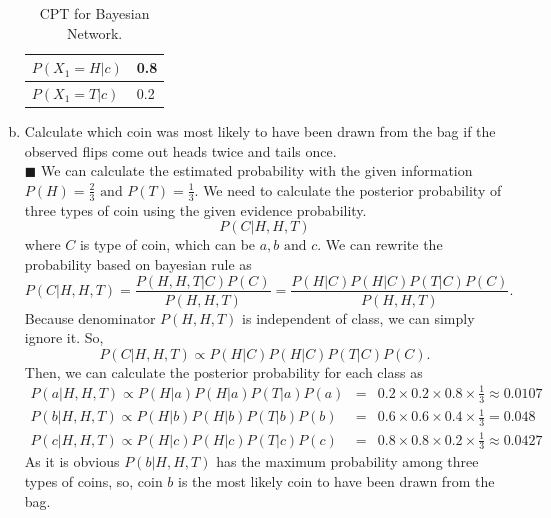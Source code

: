 \documentclass{article}
\newcommand{\solution}[1]{~\\ $\blacksquare$ \sffamily\upshape\selectfont #1
\normalfont ~\\~ }
\begin{document}
\begin{enumerate}[a.]
{\begin{table}[h]
\begin{tabular}{l|l}
      $P(X_1=H|c)$ & 0.8 \\ \midrule 
      $P(X_1=T|c)$ & 0.2 \\
      \bottomrule
    \end{tabular}
    \caption{CPT for Bayesian Network.}
    \label{tbl:ai-hwk2-14-1}
  \end{table}
  }
\item Calculate which coin was most likely to have been drawn from the
  bag if the observed flips come out heads twice and tails once.
  \solution{
    We can calculate the estimated probability with the given
    information $P(H)=\frac{2}{3} \mbox{ and } P(T)=\frac{1}{3}$. We
    need to calculate the posterior probability of three types of coin
    using the given evidence probability. 
    \[ P(C|H,H,T) \] where $C$ is type of coin, which can be $a,b
    \mbox{ and } c$. We can rewrite the probability based on bayesian
    rule as \[ P(C|H,H,T) = \frac{P(H,H,T|C)P(C)}{P(H,H,T)} =
    \frac{P(H|C)P(H|C)P(T|C)P(C)}{P(H,H,T)}. \]
    Because denominator $P(H,H,T)$ is independent of class, we can
    simply ignore it. So, 
    \[ P(C|H,H,T) \propto P(H|C)P(H|C)P(T|C)P(C). \]
    Then, we can calculate the posterior probability for each class as
    \begin{eqnarray*}
      P(a|H,H,T) \propto P(H|a)P(H|a)P(T|a)P(a) & = &
      0.2\times 0.2\times 0.8 \times \frac{1}{3} \approx 0.0107 \\
      P(b|H,H,T) \propto P(H|b)P(H|b)P(T|b)P(b) & = &
      0.6\times 0.6\times 0.4 \times \frac{1}{3} = 0.048 \\
      P(c|H,H,T) \propto P(H|c)P(H|c)P(T|c)P(c) & = &
      0.8\times 0.8\times 0.2 \times \frac{1}{3} \approx 0.0427 
    \end{eqnarray*}
    As it is obvious $P(b|H,H,T)$ has the maximum probability among
    three types of coins, so, coin $b$ is the most likely coin to have
    been drawn from the bag. 
  }
\end{enumerate}
\end{document}
